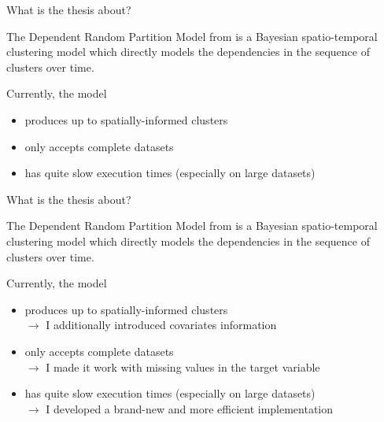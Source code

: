 \documentclass[
	11pt, %
 xcolor={dvipsnames,svgnames}
]{beamer}
\let\cite\citep
\begin{document}
\begin{frame}{What is the thesis about?}

\begin{block}{}
The Dependent Random Partition Model from \cite{1-drpm} is a Bayesian spatio-temporal clustering model which directly models the dependencies in the sequence of clusters over time.\\[6pt]
\end{block}
Currently, the model
\begin{itemize}
\item produces up to spatially-informed clusters \\
\item only accepts complete datasets \\
\item has quite slow execution times (especially on large datasets) \\
\end{itemize}
\end{frame}

\begin{frame}{What is the thesis about?}

\begin{block}{}
The Dependent Random Partition Model from \cite{1-drpm} is a Bayesian spatio-temporal clustering model which directly models the dependencies in the sequence of clusters over time.\\[6pt]
\end{block}
Currently, the model
\begin{itemize}
\item produces up to spatially-informed clusters \\\alert{$\to$ I additionally introduced covariates information}
\item only accepts complete datasets \\\alert{$\to$ I made it work with missing values in the target variable}
\item has quite slow execution times (especially on large datasets) \\\alert{$\to$ I developed a brand-new and more efficient implementation}
\end{itemize}
\end{frame}
\end{document}

